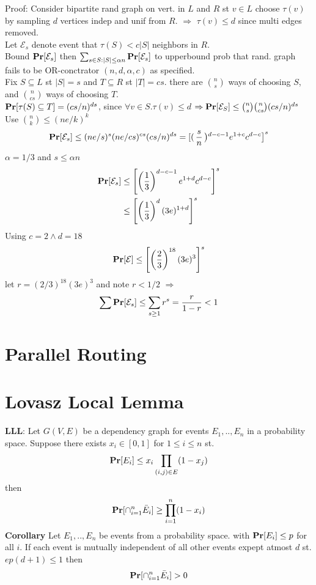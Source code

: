 \documentclass[a4paper]{article}
\def\Pr{\mbox{\textbf{Pr}}}
\begin{document}
Proof: Consider bipartite rand graph on vert. in \(L\) and \(R\) st \(v\in L\) choose \(\tau(v)\) by sampling \(d\) vertices indep and unif from \(R\). \(\Rightarrow\) \(\tau(v) \leq d\) since multi edges removed.\\
Let \(\mathcal{E}_s\) denote event that \(\tau(S) < c|S|\) neighbors in \(R\).\\
Bound \(\Pr[\mathcal{E}_s]\) then \(\sum_{s\in S: |S| \leq \alpha n} \Pr[\mathcal{E}_s]\) to upperbound prob that rand. graph fails to be OR-conctrator \((n,d,\alpha,c)\) as specified.\\
Fix \(S\subseteq L\) st \(|S|=s\) and \(T\subseteq R\) st \(|T|=cs\). there are \({n \choose s}\) ways of choosing \(S\), and \({n \choose cs}\) ways of choosing \(T\).\\
\(\Pr[\tau(S) \subseteq T] = (cs/n)^{ds}\), since \(\forall v\in S.\tau(v) \leq d\) \(\Rightarrow \Pr[\mathcal{E}_S] \leq {n \choose s} {n \choose cs} (cs/n)^{ds}\)\\
Use \({n \choose k} \leq (ne/k)^k\)
\[\Pr[\mathcal{E}_s]\leq (ne/s)^s(ne/cs)^{cs}(cs/n)^{ds}  = \left[\right(\frac{s}{n}\left)^{d-c-1} e^{1+c} c^{d-c}\right]^s\]
\(\alpha = 1/3\) and \(s \leq \alpha n\)\\
\begin{align*}
\Pr[\mathcal{E}_s] &\leq \left[\left(\frac{1}{3}\right)^{d-c-1} e^{1+d} c^{d-c}\right]^s\\
                   &\leq \left[\left(\frac{1}{3}\right)^{d} (3e)^{1+d}\right]^s
\end{align*}
Using \(c=2 \wedge d=18\)
\[\Pr[\mathcal{E}] \leq \left[\left(\frac{2}{3}\right)^{18}(3e)^3\right]^s\]
let \(r=(2/3)^{18}(3e)^3\) and note \(r < 1/2\) \(\Rightarrow\)
\[\sum \Pr[\mathcal{E}_s] \leq \sum_{s\geq 1} r^s = \frac{r}{1-r} < 1\]
\section{Parallel Routing}

\section{Lovasz Local Lemma}

\textbf{LLL}: Let \(G(V,E)\) be a dependency graph for events \(E_1,..,E_n\) in a probability space. Suppose there exists \(x_i \in [0,1]\) for \(1\leq i \leq n\) st.
\[\Pr[E_i] \leq x_i \prod_{(i,j) \in E} (1-x_j)\]
then
\[\Pr[\cap_{i=1}^n \bar{E}_i] \geq \prod_{i=1}^n (1-x_i)\]
\textbf{Corollary} Let \(E_1,..,E_n\) be events from a probability space. with \(\Pr[E_i] \leq p\) for all \(i\). If each event is mutually independent of all other events expept atmost \(d\) st. \(ep(d+1) \leq 1\) then 
\[\Pr[\cap_{i=1}^n \bar{E}_i] > 0\]
\end{document}
